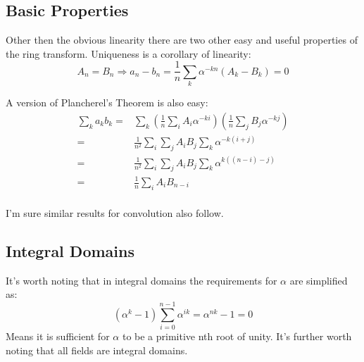\subsection{Basic Properties}
Other then the obvious linearity there are two other easy and useful properties of the ring transform.
Uniqueness is a corollary of linearity:
\[A_n=B_n \Rightarrow a_n-b_n = \frac{1}{n}\sum_k\alpha^{-kn}(A_k-B_k) = 0\]

A version of Plancherel's Theorem is also easy:
\begin{equation*}
\begin{aligned}
	\sum_k a_kb_k =& \sum_k \left(\frac{1}{n}\sum_iA_i\alpha^{-ki}\right) \left(\frac{1}{n}\sum_jB_j\alpha^{-kj}\right) \\
	=&  \frac{1}{n^2}\sum_i\sum_jA_iB_j \sum_k\alpha^{-k(i+j)}  \\
	=&  \frac{1}{n^2}\sum_i\sum_jA_iB_j \sum_k\alpha^{k((n-i)-j)}  \\
	=&  \frac{1}{n}\sum_iA_iB_{n-i}  \\
\end{aligned}
\end{equation*}

I'm sure similar results for convolution also follow.

\subsection{Integral Domains}
It's worth noting that in integral domains the requirements for $\alpha$ are simplified as:
\[(\alpha^k-1)\sum_{i=0}^{n-1}\alpha^{ik} = \alpha^{nk}-1 = 0\]
Means it is sufficient for $\alpha$ to be a primitive nth root of unity.
It's further worth noting that all fields are integral domains.

